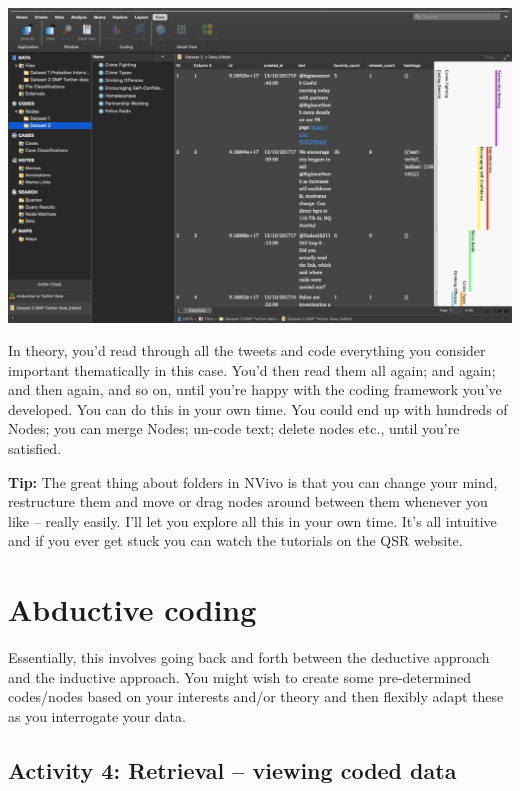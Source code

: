 \documentclass[
]{book}
\begin{document}
\includegraphics{imgs/codes_inductive.png}

In theory, you'd read through all the tweets and code everything you consider important thematically in this case. You'd then read them all again; and again; and then again, and so on, until you're happy with the coding framework you've developed. You can do this in your own time. You could end up with hundreds of Nodes; you can merge Nodes; un-code text; delete nodes etc., until you're satisfied.

\textbf{Tip:} The great thing about folders in NVivo is that you can change your mind, restructure them and move or drag nodes around between them whenever you like -- really easily. I'll let you explore all this in your own time. It's all intuitive and if you ever get stuck you can watch the tutorials on the QSR website.

\hypertarget{abductive-coding}{%
\section{Abductive coding}\label{abductive-coding}}

Essentially, this involves going back and forth between the deductive approach and the inductive approach. You might wish to create some pre-determined codes/nodes based on your interests and/or theory and then flexibly adapt these as you interrogate your data.

\hypertarget{activity-4-retrieval-viewing-coded-data}{%
\subsection{Activity 4: Retrieval -- viewing coded data}\label{activity-4-retrieval-viewing-coded-data}}
\end{document}
